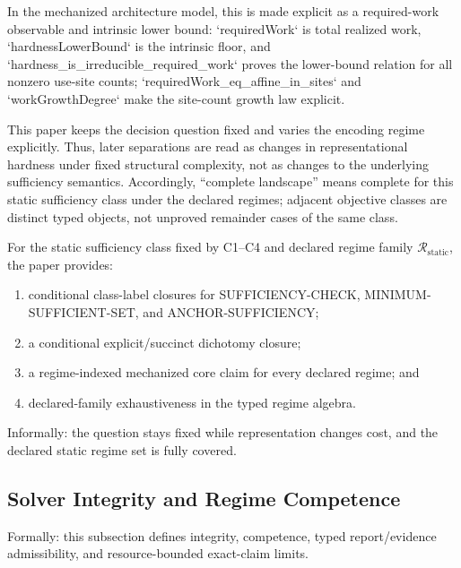 In the mechanized architecture model, this is made explicit as a required-work observable and intrinsic lower bound: `requiredWork` is total realized work, `hardnessLowerBound` is the intrinsic floor, and `hardness\_is\_irreducible\_required\_work` proves the lower-bound relation for all nonzero use-site counts; `requiredWork\_eq\_affine\_in\_sites` and `workGrowthDegree` make the site-count growth law explicit.

\begin{remark}
This paper keeps the decision question fixed and varies the encoding regime explicitly. Thus, later separations are read as changes in representational hardness under fixed structural complexity, not as changes to the underlying sufficiency semantics.
Accordingly, ``complete landscape'' means complete for this static sufficiency class under the declared regimes; adjacent objective classes are distinct typed objects, not unproved remainder cases of the same class.
\end{remark}

\begin{theorem}\label{thm:typed-completeness-static}
For the static sufficiency class fixed by C1--C4 and declared regime family $\mathcal{R}_{\mathrm{static}}$, the paper provides:
\begin{enumerate}
\item conditional class-label closures for SUFFICIENCY-CHECK, MINIMUM-SUFFICIENT-SET, and ANCHOR-SUFFICIENCY;
\item a conditional explicit/succinct dichotomy closure;
\item a regime-indexed mechanized core claim for every declared regime; and
\item declared-family exhaustiveness in the typed regime algebra.
\end{enumerate}
\end{theorem}

Informally: the question stays fixed while representation changes cost, and the declared static regime set is fully covered.

\subsection{Solver Integrity and Regime Competence}

Formally: this subsection defines integrity, competence, typed report/evidence admissibility, and resource-bounded exact-claim limits.

